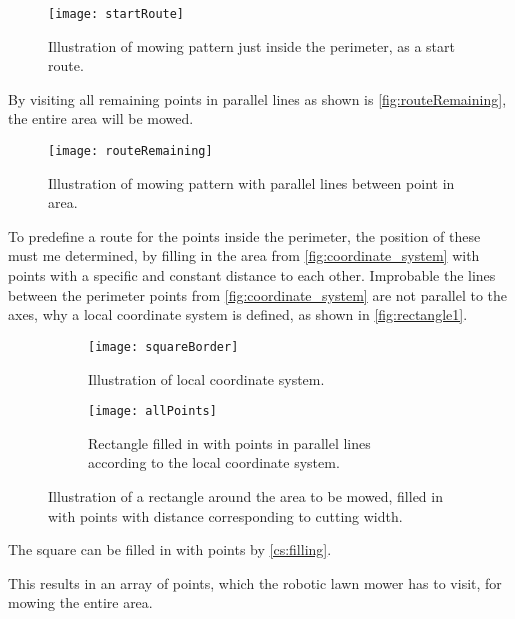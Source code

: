 \begin{figure}[htb]
\centering
\texttt{[image: startRoute]}
\caption{Illustration of mowing pattern just inside the perimeter, as a start route.}
\label{fig:startRoute}
\end{figure}

By visiting all remaining points in parallel lines as shown is \autoref{fig:routeRemaining}, the entire area will be mowed.

\begin{figure}[htb]
\centering
\texttt{[image: routeRemaining]}
\caption{Illustration of mowing pattern with parallel lines between point in area.}
\label{fig:routeRemaining}
\end{figure}

To predefine a route for the points inside the perimeter, the position of these must me determined, by filling in the area from \autoref{fig:coordinate_system} with points with a specific and constant distance to each other. 
Improbable the lines between the perimeter points from \autoref{fig:coordinate_system} are not parallel to the axes, why a local coordinate system is defined, as shown in \autoref{fig:rectangle1}.

\begin{figure}[htb]
    \centering
    \begin{subfigure}[b]{0.45\textwidth}
        \texttt{[image: squareBorder]}
        \caption{Illustration of local coordinate system.}
        \label{fig:rectangle1}
    \end{subfigure}
    \begin{subfigure}[b]{0.45\textwidth}
         \texttt{[image: allPoints]}
        \caption{Rectangle filled in with points in parallel lines according to the local coordinate system.}
        \label{fig:rectangle2}
    \end{subfigure}
    \caption{Illustration of a rectangle around the area to be mowed, filled in with points with distance corresponding to cutting width.}\label{fig:rectangle}
\end{figure}

The square can be filled in with points by \autoref{cs:filling}.


This results in an array of points, which the robotic lawn mower has to visit, for mowing the entire area. 

